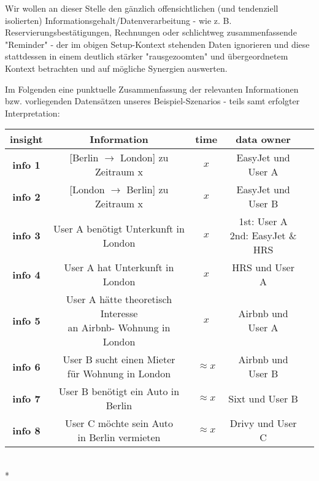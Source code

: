 \begin{Example}
\vspace{0.2cm}

Wir wollen an dieser Stelle den gänzlich offensichtlichen (und tendenziell isolierten) Informationsgehalt/Datenverarbeitung - wie z. B. Reservierungsbestätigungen, Rechnungen oder schlichtweg zusammenfassende "Reminder" - der im obigen Setup-Kontext stehenden Daten ignorieren und diese stattdessen in einem deutlich stärker "rausgezoomten" und übergeordnetem Kontext betrachten und auf mögliche Synergien auswerten.

\vspace{0.1cm} 

Im Folgenden eine punktuelle Zusammenfassung der relevanten Informationen bzw. vorliegenden Datensätzen unseres Beispiel-Szenarios - teils samt erfolgter Interpretation:

\vspace{0.2cm}

\begin{tabular}[h]{|c|c|c|c|c}
\hline
\textbf{insight} & \textbf{Information} & \textbf{time} & \textbf{data owner} \\
\hline
\textbf{info 1} & [Berlin $\rightarrow$ London] zu Zeitraum x & $x$ & EasyJet und User A \\
\hline
\textbf{info 2} & [London $\rightarrow$ Berlin] zu Zeitraum x & $x$ & EasyJet und User B \\
\hline
\textbf{info 3} & User A benötigt Unterkunft in London & $x$ & \parbox{3.5cm}{1st: User A \\ 2nd: EasyJet \& HRS} \\
\hline
\textbf{info 4} & User A hat Unterkunft in London & $x$ & HRS und User A \\
\hline
\textbf{info 5} & \parbox{5.7cm}{User A hätte theoretisch Interesse \\ an Airbnb- Wohnung in London} & $x$ & Airbnb und User A \\
\hline
\textbf{info 6} & \parbox{5.5cm}{User B sucht einen Mieter \\ für Wohnung in London} & $\approx x$ & Airbnb und User B \\
\hline
\textbf{info 7} & User B benötigt ein Auto in Berlin & $\approx x$ & Sixt und User B \\
\hline
\textbf{info 8} & \parbox{5.5cm}{User C möchte sein Auto \\ in Berlin vermieten} & $\approx x$ & Drivy und User C \\
\hline
\end{tabular}\vspace*{0.3cm}\\*


\end{Example}
